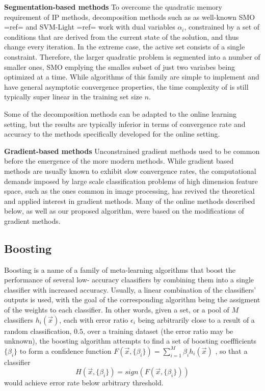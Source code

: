 {{\bf Segmentation-based methods}
To overcome the quadratic memory requirement of IP methods, decomposition methods such as  as well-known SMO {{=ref=}} and SVM-Light {{=ref=}} work with dual variables $\alpha_i$, constrained by a set of conditions that are derived from the current state of the solution, and thus change every iteration.  In the extreme case, the active set consists of a single constraint. Therefore, the larger quadratic problem is segmented into a number of smaller ones, SMO emplying the smalles subset of just two variabes being optimized at a time. While algorithms of  this family are simple to implement and have general asymptotic convergence properties, the time complexity of  is  still typically super linear in the training set size $n$. 

Some of the decomposition methods can be adapted to the online learning setting, but the results are typically inferior in terms of convergence rate and accuracy to the methods specifically developed for the online setting.

{\bf Gradient-based methods}
Unconstrained gradient methods used to be common before the emergence of the more modern methods. While gradient based methods are usually known to exhibit slow convergence rates, the computational demands imposed by large scale classification problems of high dimension feature space, such as the ones common in image processing,  has revived the theoretical and applied interest in gradient methods. Many of the online methods described below, as well as our proposed algorithm, were based on the modifications of gradient methods.

\subsection{Boosting}
Boosting is a name of a family of meta-learning algorithms that boost the performance of several low- accuracy claasifiers by combining them into a single classifier with increased accuracy. Usually, a linear combination of the classifiers' outputs is used, with the goal of the corresponding algorithm being the assigment of the  weights to each classifier. In other words, given a set, or a pool of $M$ classifiers $h_i(\vec{x})$, each with error ratio $\epsilon_i$ being arbitrarily close to a result of a random classification, $0.5$,  over a training dataset (the error ratio may be unknown), the boosting algorithm attempts to find a set of boosting coeffficients $\{\beta_i\}$ to form a confidence function $F(\vec{x},\{\beta_i\})=\sum_{i=1}^{M}\beta_i h_i(\vec{x})$ , so that a classifier
\begin{equation}
\label{BoostingClassifier}
H(\vec{x},\{\beta_i\})=sign(F(\vec{x},\{\beta_i\}))
\end{equation}
would achieve error rate below arbitrary threshold.

}
